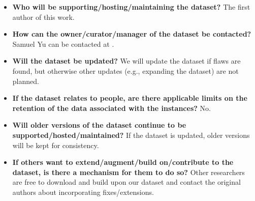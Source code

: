 \documentclass[runningheads]{llncs}
\begin{document}
\begin{itemize}
    \item \textbf{Who will be supporting/hosting/maintaining the dataset?} The first author of this work. 
    \item \textbf{How can the owner/curator/manager of the dataset be contacted?} Samuel Yu can be contacted at .
    \item \textbf{Will the dataset be updated?} We will update the dataset if flaws are found, but otherwise other updates (e.g., expanding the dataset) are not planned.
    \item \textbf{If the dataset relates to people, are there applicable limits on the retention of the data associated with the instances?} No.
    \item \textbf{Will older versions of the dataset continue to be supported/hosted/maintained?} If the dataset is updated, older versions will be kept for consistency. 
    \item \textbf{If others want to extend/augment/build on/contribute to the
dataset, is there a mechanism for them to do so?} Other researchers are free to download and build upon our dataset and contact the original authors about incorporating fixes/extensions. 
\end{itemize}

\clearpage
\end{document}
